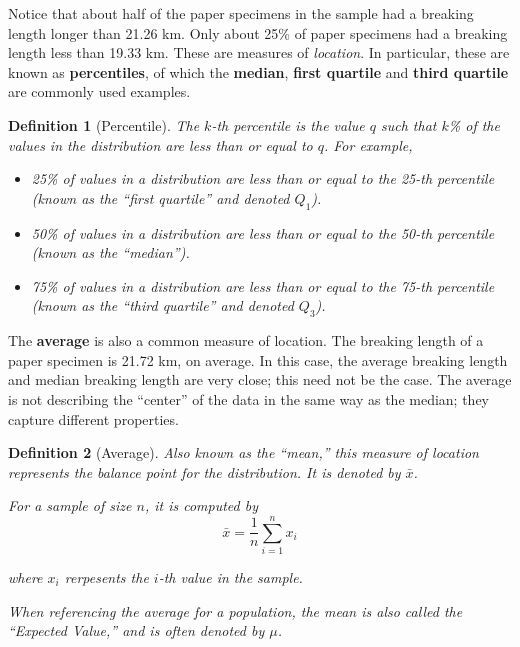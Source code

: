 \documentclass[
]{book}
\providecommand{\tightlist}{%
  \setlength{\itemsep}{0pt}\setlength{\parskip}{0pt}}
\theoremstyle{plain}
\theoremstyle{mydefn}
\newtheorem{definition}{Definition}[chapter]
\theoremstyle{myexmpl}
\theoremstyle{remark}
\begin{document}
Notice that about half of the paper specimens in the sample had a breaking length longer than 21.26 km. Only about 25\% of paper specimens had a breaking length less than 19.33 km. These are measures of \emph{location}. In particular, these are known as \textbf{percentiles}, of which the \textbf{median}, \textbf{first quartile} and \textbf{third quartile} are commonly used examples.

\begin{definition}[Percentile]
\protect\hypertarget{def:defn-percentile}{}{\label{def:defn-percentile} {} }The \(k\)-th percentile is the value \(q\) such that \(k\)\% of the values in the distribution are less than or equal to \(q\). For example,

\begin{itemize}
\tightlist
\item
  25\% of values in a distribution are less than or equal to the 25-th percentile (known as the ``first quartile'' and denoted \(Q_1\)).
\item
  50\% of values in a distribution are less than or equal to the 50-th percentile (known as the ``median'').
\item
  75\% of values in a distribution are less than or equal to the 75-th percentile (known as the ``third quartile'' and denoted \(Q_3\)).
\end{itemize}
\end{definition}

The \textbf{average} is also a common measure of location. The breaking length of a paper specimen is 21.72 km, on average. In this case, the average breaking length and median breaking length are very close; this need not be the case. The average is not describing the ``center'' of the data in the same way as the median; they capture different properties.

\begin{definition}[Average]
\protect\hypertarget{def:defn-average}{}{\label{def:defn-average} {} }Also known as the ``mean,'' this measure of location represents the balance point for the distribution. It is denoted by \(\bar{x}\).

For a sample of size \(n\), it is computed by
\[\bar{x} = \frac{1}{n}\sum_{i=1}^{n} x_i\]

where \(x_i\) rerpesents the \(i\)-th value in the sample.

When referencing the average for a population, the mean is also called the ``Expected Value,'' and is often denoted by \(\mu\).
\end{definition}
\end{document}
